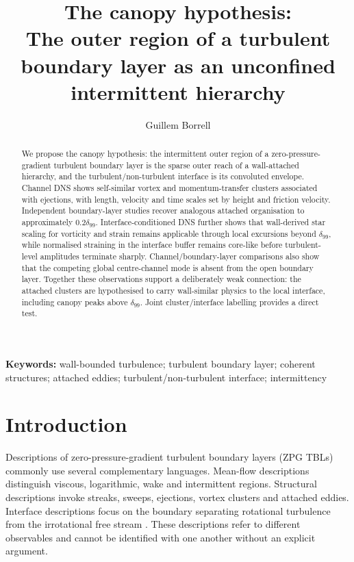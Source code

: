 \documentclass[11pt]{article}
\title{The canopy hypothesis:\\
The outer region of a turbulent boundary layer as an unconfined intermittent hierarchy}
\author{Guillem Borrell}
\date{}
\begin{document}
\maketitle

\begin{abstract}
We propose the canopy hypothesis: the intermittent outer region of a zero-pressure-gradient turbulent boundary layer is the sparse outer reach of a wall-attached hierarchy, and the turbulent/non-turbulent interface is its convoluted envelope. Channel DNS shows self-similar vortex and momentum-transfer clusters associated with ejections, with length, velocity and time scales set by height and friction velocity. Independent boundary-layer studies recover analogous attached organisation to approximately $0.2\delta_{99}$. Interface-conditioned DNS further shows that wall-derived star scaling for vorticity and strain remains applicable through local excursions beyond $\delta_{99}$, while normalised straining in the interface buffer remains core-like before turbulent-level amplitudes terminate sharply. Channel/boundary-layer comparisons also show that the competing global centre-channel mode is absent from the open boundary layer. Together these observations support a deliberately weak connection: the attached clusters are hypothesised to carry wall-similar physics to the local interface, including canopy peaks above $\delta_{99}$. Joint cluster/interface labelling provides a direct test.
\end{abstract}

\noindent\textbf{Keywords:} wall-bounded turbulence; turbulent boundary layer; coherent structures; attached eddies; turbulent/non-turbulent interface; intermittency

\section{Introduction}

Descriptions of zero-pressure-gradient turbulent boundary layers (ZPG TBLs) commonly use several complementary languages.  Mean-flow descriptions distinguish viscous, logarithmic, wake and intermittent regions.  Structural descriptions invoke streaks, sweeps, ejections, vortex clusters and attached eddies.  Interface descriptions focus on the boundary separating rotational turbulence from the irrotational free stream \citep{CorrsinKistler1955,BorrellJimenez2016}.  These descriptions refer to different observables and cannot be identified with one another without an explicit argument.
\end{document}
